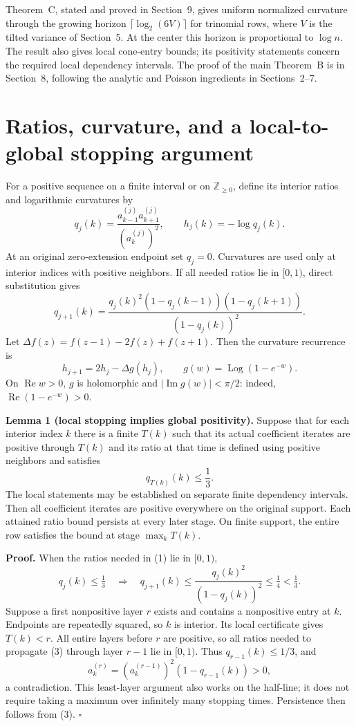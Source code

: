 \documentclass[11pt,a4paper]{article}
\begin{document}
Theorem~C, stated and proved in Section~9, gives uniform normalized curvature through the growing horizon \(\lceil\log_2(6V)\rceil\) for trinomial rows, where \(V\) is the tilted variance of Section~5. At the center this horizon is proportional to \(\log n\). The result also gives local cone-entry bounds; its positivity statements concern the required local dependency intervals. The proof of the main Theorem~B is in Section~8, following the analytic and Poisson ingredients in Sections~2--7.

\section{Ratios, curvature, and a local-to-global stopping argument}\label{ratios-curvature-and-a-local-to-global-stopping-argument}


For a positive sequence on a finite interval or on
\(\mathbb Z_{\geq0}\), define its interior ratios and logarithmic
curvatures by \[
 q_j(k)=\frac{a^{(j)}_{k-1}a^{(j)}_{k+1}}{(a^{(j)}_k)^2},
 \qquad h_j(k)=-\log q_j(k).
\] At an original zero-extension endpoint set \(q_j=0\). Curvatures are
used only at interior indices with positive neighbors. If all needed
ratios lie in \([0,1)\), direct substitution gives \[
 q_{j+1}(k)=
 \frac{q_j(k)^2(1-q_j(k-1))(1-q_j(k+1))}{(1-q_j(k))^2}. \tag{1}
\] Let \(\Delta f(z)=f(z-1)-2f(z)+f(z+1)\). Then the curvature
recurrence is \[
 h_{j+1}=2h_j-\Delta g(h_j),\qquad
 g(w)=\operatorname{Log}(1-e^{-w}). \tag{2}
\] On \(\operatorname{Re}w>0\), \(g\) is holomorphic and
\(|\operatorname{Im}g(w)|<\pi/2\): indeed,
\(\operatorname{Re}(1-e^{-w})>0\).

\textbf{Lemma 1 (local stopping implies global positivity).} Suppose
that for each interior index \(k\) there is a finite \(T(k)\) such that
its actual coefficient iterates are positive through \(T(k)\) and its
ratio at that time is defined using positive neighbors and satisfies \[
 q_{T(k)}(k)\leq\frac13.
\] The local statements may be established on separate finite dependency
intervals. Then all coefficient iterates are positive everywhere on the
original support. Each attained ratio bound persists at every later
stage. On finite support, the entire row satisfies the bound at stage
\(\max_kT(k)\).

\textbf{Proof.} When the ratios needed in (1) lie in \([0,1)\), \[
 q_j(k)\leq\tfrac13
 \quad\Longrightarrow\quad
 q_{j+1}(k)\leq\frac{q_j(k)^2}{(1-q_j(k))^2}
 \leq\tfrac14<\tfrac13. \tag{3}
\] Suppose a first nonpositive layer \(r\) exists and contains a
nonpositive entry at \(k\). Endpoints are repeatedly squared, so \(k\)
is interior. Its local certificate gives \(T(k)<r\). All entire layers
before \(r\) are positive, so all ratios needed to propagate (3) through
layer \(r-1\) lie in \([0,1)\). Thus \(q_{r-1}(k)\leq1/3\), and \[
 a^{(r)}_k=(a^{(r-1)}_k)^2(1-q_{r-1}(k))>0,
\] a contradiction. This least-layer argument also works on the
half-line; it does not require taking a maximum over infinitely many
stopping times. Persistence then follows from (3). \(\square\)
\end{document}
